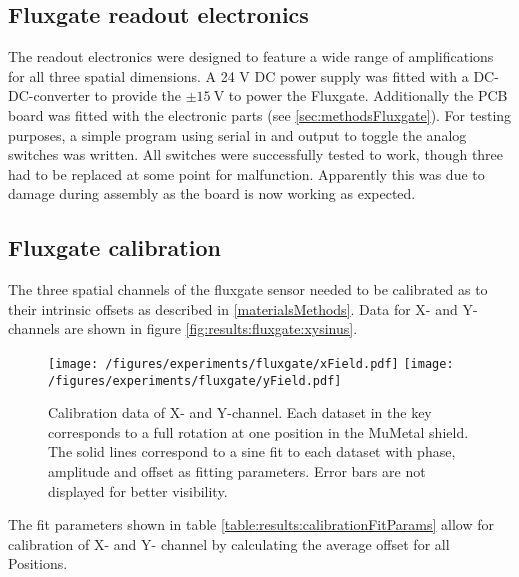     \subsection{Fluxgate readout electronics}
        The readout electronics were designed to feature a wide range of amplifications for all three spatial dimensions. A 24 V DC power supply was fitted with a DC-DC-converter to provide the $\pm\SI{15}{\volt}$ to power the Fluxgate. Additionally the PCB board was fitted with the electronic parts (see \ref{sec:methodsFluxgate}). For testing purposes, a simple program using serial in and output to toggle the analog switches was written. All switches were successfully tested to work, though three had to be replaced at some point for malfunction.  Apparently this was due to damage during assembly as the board is now working as expected.
    \subsection{Fluxgate calibration}
        The three spatial channels of the fluxgate sensor needed to be calibrated as to their intrinsic offsets as described in \ref{materialsMethods}. Data for X- and Y-channels are shown in figure \ref{fig:results:fluxgate:xysinus}.
        \begin{figure}
            \label{fig:results:fluxgate:ysinus}
            \centering
            \texttt{[image: /figures/experiments/fluxgate/xField.pdf]}
            \texttt{[image: /figures/experiments/fluxgate/yField.pdf]}
            \caption[Calibration results X/Y]{Calibration data of X- and Y-channel. Each dataset in the key
            corresponds to a full rotation at one position in the MuMetal shield. The solid lines correspond to
            a sine fit to each dataset with phase, amplitude and offset as fitting parameters. Error bars are not
            displayed for better visibility.}
        \end{figure}
        The fit parameters shown in table \ref{table:results:calibrationFitParams} allow for calibration of X- and Y- channel by calculating the average offset for all Positions.
